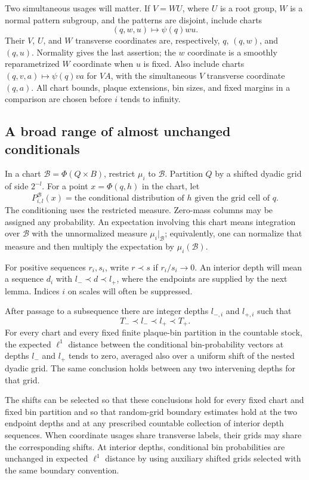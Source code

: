 Two simultaneous usages will matter. If $V=WU$, where $U$ is a root
group, $W$ is a normal pattern subgroup, and the patterns are disjoint,
include charts
\[
 (q,w,u)\longmapsto\psi(q)wu.
\]
Their $V$, $U$, and $W$ transverse coordinates are, respectively,
$q$, $(q,w)$, and $(q,u)$. Normality gives the last assertion; the
$w$ coordinate is a smoothly reparametrized $W$ coordinate when $u$
is fixed. Also include charts $(q,v,a)\mapsto\psi(q)va$ for $VA$, with
the simultaneous $V$ transverse coordinate $(q,a)$. All chart bounds,
plaque extensions, bin sizes, and fixed margins in a comparison are
chosen before $i$ tends to infinity.

\subsection{A broad range of almost unchanged conditionals}

In a chart $\mathcal B=\Phi(Q\times B)$, restrict $\mu_i$ to
$\mathcal B$. Partition $Q$ by a shifted dyadic grid of side $2^{-l}$.
For a point $x=\Phi(q,h)$ in the chart, let
\[
 P^{\mathcal B}_{i,l}(x)
   =\text{the conditional distribution of $h$ given the grid cell of $q$}.
\]
The conditioning uses the restricted measure. Zero-mass columns may
be assigned any probability. An expectation involving this chart
means integration over $\mathcal B$ with the unnormalized measure
$\mu_i|_{\mathcal B}$; equivalently, one can normalize that measure and
then multiply the expectation by $\mu_i(\mathcal B)$.

For positive sequences $r_i,s_i$, write $r\prec s$ if $r_i/s_i\to0$.
An interior depth will mean a sequence $d_i$ with
$l_-\prec d\prec l_+$, where the endpoints are supplied by the next
lemma. Indices $i$ on scales will often be suppressed.

\begin{lemma}\label{lem:plateau}
After passage to a subsequence there are integer depths $l_{-,i}$ and
$l_{+,i}$ such that
\begin{equation}\label{eq:plateau-room}
 T_-\prec l_-\prec l_+\prec T_+.
\end{equation}
For every chart and every fixed finite plaque-bin partition in the
countable stock, the expected $\ell^1$ distance between the
conditional bin-probability vectors at depths $l_-$ and $l_+$ tends
to zero, averaged also over a uniform shift of the nested dyadic
grid. The same conclusion holds between any two intervening depths
for that grid.

The shifts can be selected so that these conclusions hold for every
fixed chart and fixed bin partition and so that random-grid boundary
estimates hold at the two endpoint depths and at any prescribed
countable collection of interior depth sequences. When coordinate
usages share transverse labels,
their grids may share the corresponding shifts. At interior depths,
conditional bin probabilities are unchanged in expected $\ell^1$
distance by using auxiliary shifted grids selected with the same
boundary convention.
\end{lemma}

